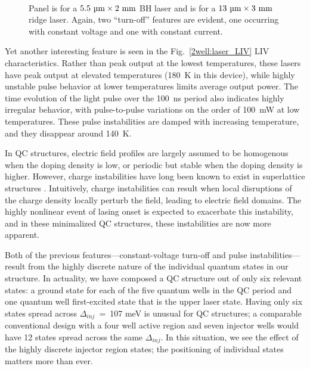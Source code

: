 \begin{figure}[tp]%
\centering%
%
\\%
%
\caption[Pulsed LIV data for the two injector well structure (II)]{ Panel  is for a $5.5~\tn{\um}\times2~\tn{mm}$ BH laser and  is for a $13~\tn{\um}\times3~\tn{mm}$ ridge laser.  Again, two ``turn-off'' features are evident, one occurring with constant voltage and one with constant current.}
\label{2well:laser_LIV2}
\end{figure}


Yet another interesting feature is seen in the Fig.~\ref{2well:laser_LIV} LIV characteristics.  Rather than peak output at the lowest temperatures, these lasers have peak output at elevated temperatures (180~K in this device), while highly unstable pulse behavior at lower temperatures limits average output power. The time evolution of the light pulse over the 100~ns period also indicates highly irregular behavior, with pulse-to-pulse variations on the order of 100~mW at low temperatures. These pulse instabilities are damped with increasing temperature, and they disappear around 140~K.


In QC structures, electric field profiles are largely assumed to be homogenous when the doping density is low, or periodic but stable when the doping density is higher. However, charge instabilities have long been known to exist in superlattice structures \cite{Leo:book:2006}. Intuitively, charge instabilities can result when local disruptions of the charge density locally perturb the field, leading to electric field domains. The highly nonlinear event of lasing onset is expected to exacerbate this instability, and in these minimalized QC structures, these instabilities are now more apparent.

Both of the previous features---constant-voltage turn-off and pulse instabilities---result from the highly discrete nature of the individual quantum states in our structure.  In actuality, we have composed a QC structure out of only six relevant states: a ground state for each of the five quantum wells in the QC period and one quantum well first-excited state that is the upper laser state.  Having only six states spread across $\Delta_\textit{inj}$~=~107 meV is unusual for QC structures; a comparable conventional design with a four well active region and seven injector wells would have 12 states spread across the same $\Delta_\textit{inj}$. In this situation, we see the effect of the highly discrete injector region states; the positioning of individual states matters more than ever.

